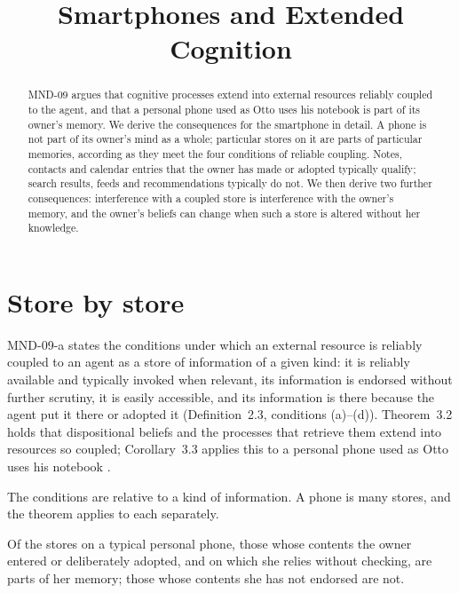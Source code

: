 \documentclass{situationist-preprint}
\title{Smartphones and Extended Cognition}
\begin{document}
\maketitle

\begin{abstract}
MND-09 argues that cognitive processes extend into external resources reliably coupled to the agent, and that a personal phone used as Otto uses his notebook is part of its owner's memory. We derive the consequences for the smartphone in detail. A phone is not part of its owner's mind as a whole; particular stores on it are parts of particular memories, according as they meet the four conditions of reliable coupling. Notes, contacts and calendar entries that the owner has made or adopted typically qualify; search results, feeds and recommendations typically do not. We then derive two further consequences: interference with a coupled store is interference with the owner's memory, and the owner's beliefs can change when such a store is altered without her knowledge.
\end{abstract}

\section{Store by store}

MND-09-a states the conditions under which an external resource is reliably coupled to an agent as a store of information of a given kind: it is reliably available and typically invoked when relevant, its information is endorsed without further scrutiny, it is easily accessible, and its information is there because the agent put it there or adopted it (Definition~2.3, conditions (a)--(d)). Theorem~3.2 holds that dispositional beliefs and the processes that retrieve them extend into resources so coupled; Corollary~3.3 applies this to a personal phone used as Otto uses his notebook \citep{ClarkChalmers1998}.

The conditions are relative to a kind of information. A phone is many stores, and the theorem applies to each separately.

\begin{proposition}\label{p:stores}
Of the stores on a typical personal phone, those whose contents the owner entered or deliberately adopted, and on which she relies without checking, are parts of her memory; those whose contents she has not endorsed are not.
\end{proposition}
\end{document}
